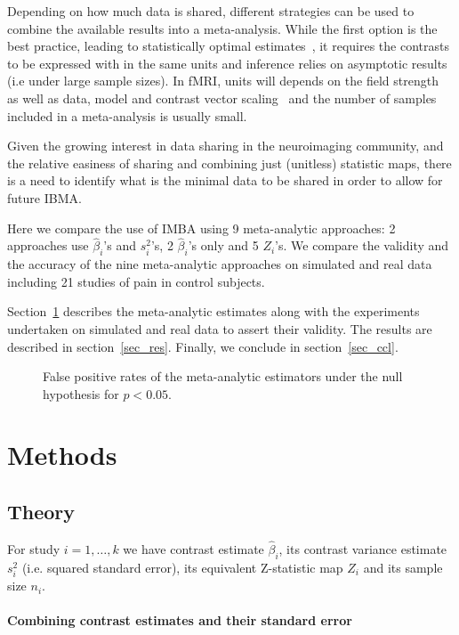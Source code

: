 \documentclass[preprint]{elsarticle}
\newcommand{\effectvector}{\hat\beta}
\newcommand{\effect}[1][i]{\effectvector_{#1}}
\newcommand{\vareffect}[1][i]{s^2_{#1}}
\newcommand{\zeffect}[1][\studyidx]{Z_{#1}}
\newcommand{\nStudies}{k}
\newcommand{\studyidx}{i}
\begin{document}
Depending on how much data is shared, different strategies can be used to combine the available results into a meta-analysis. While the first option is the best practice, leading to statistically optimal estimates~\cite{Cummings2004}, it requires the contrasts to be expressed with in the same units and inference relies on asymptotic results (i.e under large sample sizes). In fMRI, units will depends on the field strength~\cite{Chen2016} as well as data, model and contrast vector scaling~\cite{Nichols2012units} and the number of samples included in a meta-analysis is usually small.

Given the growing interest in data sharing in the neuroimaging community, and the relative easiness of sharing and combining just (unitless) statistic maps, there is a need to identify what is the minimal data to be shared in order to allow for future IBMA.

Here we compare the use of IMBA using 9 meta-analytic approaches: 2 approaches use $\effect$'s and $\vareffect$'s, 2 $\effect$'s only and 5 $\zeffect$'s. We compare the validity and the accuracy of the nine meta-analytic approaches on simulated and real data including 21 studies of pain in control subjects.

Section~\ref{sec_meth} describes the meta-analytic estimates along with the experiments undertaken on simulated and real data to assert their validity. The results are described in section~\ref{sec_res}. Finally, we conclude in section~\ref{sec_ccl}.

\begin{figure}[t]
	\centering
	\caption{False positive rates of the meta-analytic estimators under the null hypothesis for $p<0.05$.}
	\label{fig_fpr_all}
\end{figure}

\section{Methods}\label{sec_meth}
\subsection{Theory}
For study $\studyidx=1,\ldots,\nStudies$ we have contrast estimate $\effect$, its contrast variance estimate $\vareffect$ (i.e. squared standard error), its equivalent Z-statistic map $Z_i$ and its sample size $n_i$.  

\paragraph{Combining contrast estimates and their standard error}
\end{document}

